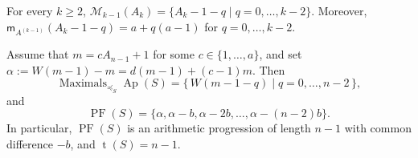 \documentclass[10pt,a4paper]{amsart}
\begin{document}
\begin{lemma}\label{lem:full-level-maximals}
For every $k\ge 2$, $\mathcal M_{k-1}(A_k)=\{A_k-1-q\mid q=0,\ldots,k-2\}$. Moreover, $\mathsf m_{A^{(k-1)}}(A_k-1-q)=a+q(a-1)$ for $q=0,\ldots,k-2$.
\end{lemma}

\begin{theorem}\label{th:arith_family_PF}
Assume that $m=cA_{n-1}+1$ for some $c\in\{1,\dots,a\}$, and set
$\alpha:=W(m-1)-m=d(m-1)+(c-1)m$. Then
\[
\operatorname{Maximals}_{\preceq_S}\operatorname{Ap}(S)
=
\{\,W(m-1-q)\mid q=0,\ldots,n-2\,\},
\]
and
\[
\operatorname{PF}(S)
=
\{\alpha,\alpha-b,\alpha-2b,\ldots,\alpha-(n-2)b\}.
\]
In particular, $\operatorname{PF}(S)$ is an arithmetic progression of
length $n-1$ with common difference $-b$, and $\operatorname{t}(S)=n-1$.
\end{theorem}
\end{document}
